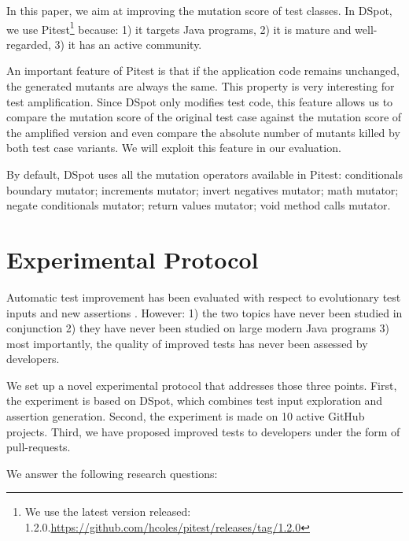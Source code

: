 \documentclass[table,xcdraw,smallextended]{svjour3}
\newcommand{\dspot}{DSpot\xspace}
\newcommand{\gh}{GitHub\xspace}
\newcommand{\pitest}{Pitest\xspace}
\newcommand{\ms}{mutation score\xspace}
\begin{document}
\label{subsub:pitest}
In this paper, we aim at improving the \ms of test classes.  In \dspot, we use \pitest\footnote{We use the latest version released: 1.2.0.\url{https://github.com/hcoles/pitest/releases/tag/1.2.0}} because:
1) it targets Java programs, 
2) it is mature and well-regarded,
3) it has an active community. 

An important feature of \pitest is that if the application code remains unchanged, the generated mutants are always the same.
This property is very interesting for test amplification.
Since \dspot only modifies  test code, this feature allows us to compare the \ms of the original test case against the \ms of the amplified version and even compare the absolute number of mutants killed by both test case variants. 
We will exploit this feature in our evaluation.

By default, \dspot uses all the mutation operators available in \pitest: 
    conditionals boundary mutator;
    increments mutator;
    invert negatives mutator;
    math mutator;
    negate conditionals mutator;
    return values mutator;
    void method calls mutator.


\section{Experimental  Protocol}
\label{sec:protocol}

Automatic test improvement has been evaluated with respect to evolutionary test inputs \cite{tonella} and new assertions \cite{TaoXie2006}. However:
1) the two topics have never been studied in conjunction
2) they have never been studied on large modern Java programs
3) most importantly, the quality of improved tests has never been assessed by developers.

We set up a novel experimental protocol that addresses those three points.
First, the experiment is based on \dspot, which combines test input exploration and assertion generation.
Second, the experiment is made on 10 active \gh projects.
Third, we have proposed improved tests to developers under the form of pull-requests.

We answer the following research questions:

\newcommand\rqpullrequest{RQ1\xspace}
\newcommand\rqcandidates{RQ2\xspace}
\newcommand\rqeffectiveness{RQ3\xspace}
\newcommand\rqAmplVersusIAmpl{RQ4\xspace}
\end{document}
